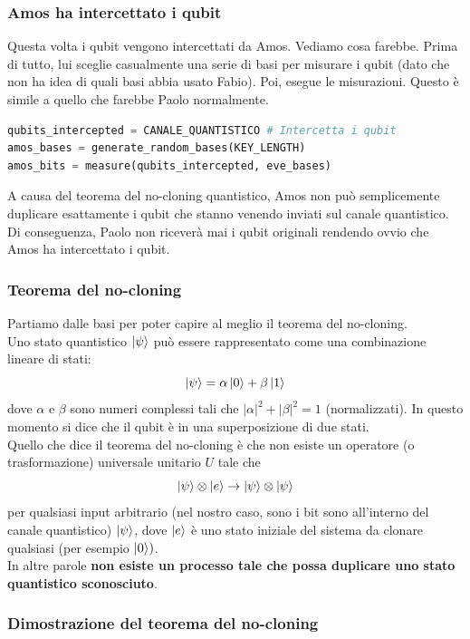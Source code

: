 \documentclass[a4paper]{article}
\begin{document}
\subsubsection{Amos ha intercettato i qubit}

Questa volta i qubit vengono intercettati da Amos. 
Vediamo cosa farebbe. Prima di tutto, lui sceglie casualmente una serie di basi
per misurare i qubit (dato che non ha idea di quali basi abbia usato Fabio).
Poi, esegue le misurazioni. Questo è simile a quello che farebbe Paolo normalmente.
\begin{lstlisting}[language=Python]
qubits_intercepted = CANALE_QUANTISTICO # Intercetta i qubit
amos_bases = generate_random_bases(KEY_LENGTH) 
amos_bits = measure(qubits_intercepted, eve_bases) 
\end{lstlisting}
A causa del teorema del no-cloning quantistico, Amos non può semplicemente duplicare esattamente 
i qubit che stanno venendo inviati sul canale quantistico. Di conseguenza, Paolo non riceverà mai 
i qubit originali rendendo ovvio che Amos ha intercettato i qubit.

\subsubsection{Teorema del no-cloning}

Partiamo dalle basi per poter capire al meglio il teorema del no-cloning.\\
Uno stato quantistico $\ket{\psi}$ può essere rappresentato come una combinazione lineare di stati:
\[
\ket{\psi} = \alpha \ket{0} + \beta \ket{1} \]
dove $\alpha$ e $\beta$ sono numeri complessi tali che $|\alpha|^2 + |\beta|^2 = 1$ (normalizzati).
In questo momento si dice che il qubit è in una superposizione di due stati.\\
Quello che dice il teorema del no-cloning è che non esiste un operatore (o trasformazione) universale unitario $U$ tale che
\[\ket{\psi} \otimes \ket{e} \rightarrow \ket{\psi} \otimes \ket{\psi}\]
per qualsiasi input arbitrario (nel nostro caso, sono i bit sono all'interno del canale quantistico) $\ket{\psi}$, dove $\ket{e}$ è uno stato iniziale del sistema da clonare qualsiasi (per esempio $\ket{0})$.\\
In altre parole \textbf{non esiste un processo tale che possa duplicare uno stato quantistico sconosciuto}.

\subsubsection*{Dimostrazione del teorema del no-cloning}
\end{document}
